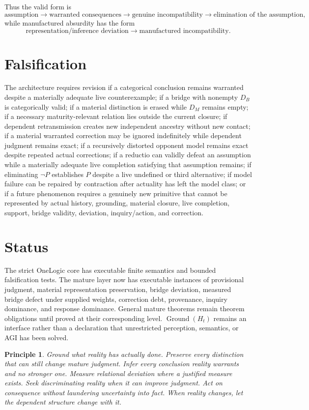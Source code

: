 \documentclass[11pt]{article}
\newtheorem{principle}{Principle}
\begin{document}
Thus the valid form is
\[
\text{assumption}\to
\text{warranted consequences}\to
\text{genuine incompatibility}\to
\text{elimination of the assumption},
\]
while manufactured absurdity has the form
\[
\text{representation/inference deviation}\to
\text{manufactured incompatibility}.
\]

\section{Falsification}
The architecture requires revision if a categorical conclusion remains warranted despite a materially adequate live counterexample; if a bridge with nonempty $D_B$ is categorically valid; if a material distinction is erased while $D_M$ remains empty; if a necessary maturity-relevant relation lies outside the current closure; if dependent retransmission creates new independent ancestry without new contact; if a material warranted correction may be ignored indefinitely while dependent judgment remains exact; if a recursively distorted opponent model remains exact despite repeated actual corrections; if a reductio can validly defeat an assumption while a materially adequate live completion satisfying that assumption remains; if eliminating $\neg P$ establishes $P$ despite a live undefined or third alternative; if model failure can be repaired by contraction after actuality has left the model class; or if a future phenomenon requires a genuinely new primitive that cannot be represented by actual history, grounding, material closure, live completion, support, bridge validity, deviation, inquiry/action, and correction.

\section{Status}
The strict OneLogic core has executable finite semantics and bounded falsification tests. The mature layer now has executable instances of provisional judgment, material representation preservation, bridge deviation, measured bridge defect under supplied weights, correction debt, provenance, inquiry dominance, and response dominance. General mature theorems remain theorem obligations until proved at their corresponding level. $\operatorname{Ground}(H_t)$ remains an interface rather than a declaration that unrestricted perception, semantics, or AGI has been solved.

\begin{principle}
Ground what reality has actually done. Preserve every distinction that can still change mature judgment. Infer every conclusion reality warrants and no stronger one. Measure relational deviation where a justified measure exists. Seek discriminating reality when it can improve judgment. Act on consequence without laundering uncertainty into fact. When reality changes, let the dependent structure change with it.
\end{principle}
\end{document}
